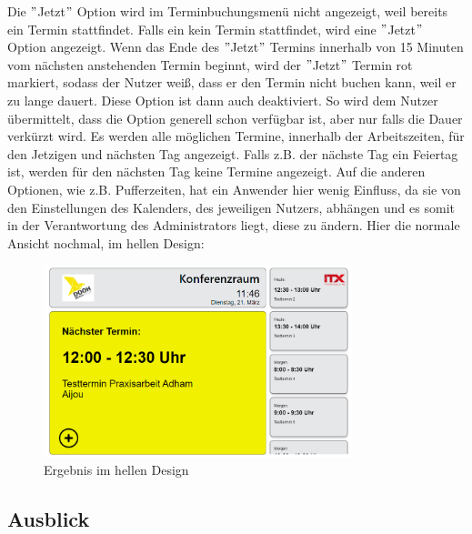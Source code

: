 Die \("\)Jetzt\("\) Option wird im Terminbuchungsmenü nicht angezeigt, weil bereits ein Termin stattfindet.
Falls ein kein Termin stattfindet, wird eine \("\)Jetzt\("\) Option angezeigt.
Wenn das Ende des \("\)Jetzt\("\) Termins innerhalb von 15 Minuten vom nächsten anstehenden Termin beginnt, wird der \("\)Jetzt\("\) Termin rot markiert, sodass der Nutzer weiß, dass er den Termin nicht buchen kann, weil er zu lange dauert.
Diese Option ist dann auch deaktiviert.
So wird dem Nutzer übermittelt, dass die Option generell schon verfügbar ist, aber nur falls die Dauer verkürzt wird.
Es werden alle möglichen Termine, innerhalb der Arbeitszeiten, für den Jetzigen und nächsten Tag angezeigt.
Falls z.B. der nächste Tag ein Feiertag ist, werden für den nächsten Tag keine Termine angezeigt.
Auf die anderen Optionen, wie z.B. Pufferzeiten, hat ein Anwender hier wenig Einfluss, da sie von den Einstellungen des Kalenders, des jeweiligen Nutzers, abhängen und es somit in der Verantwortung des Administrators liegt, diese zu ändern.
\newline
\newline
Hier die normale Ansicht nochmal, im hellen Design:
\par\vspace{1cm}
\begin{figure}[h]
    \centering
    \includegraphics[width=0.8\textwidth]{Bilder/Ergebnis_lightMode}
    \caption{Ergebnis im hellen Design}
    \label{fig:Ergebnis im hellen Design}
\par\vspace{1cm}
\end{figure}
\justifying
\newline
\newline
\pagebreak

\subsection{Ausblick}\label{subsec:ausblick}
